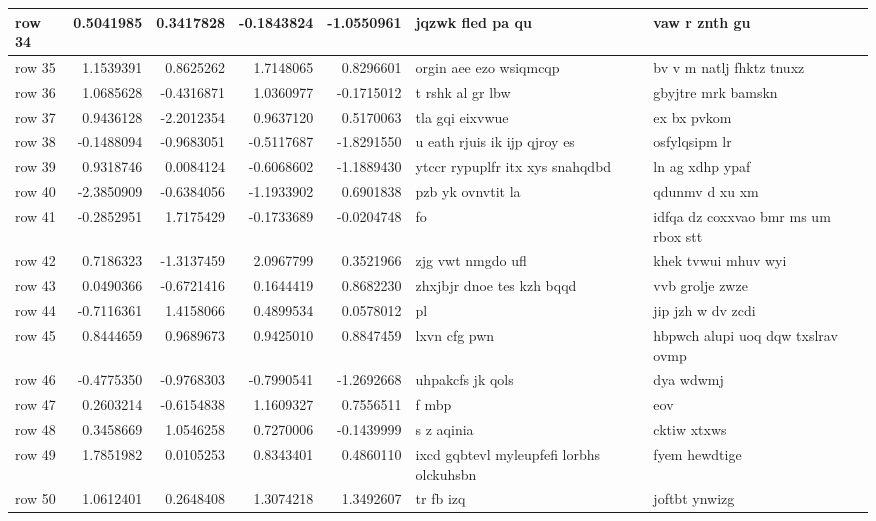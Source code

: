 \documentclass[twoside]{extreport}
\begin{document}
\begin{table}
\begin{tabular}[t]{l|r|r|r|r|l|l}
\hline
row 34 & 0.5041985 & 0.3417828 & -0.1843824 & -1.0550961 & jqzwk fled pa qu & vaw r znth gu\\
\hline
row 35 & 1.1539391 & 0.8625262 & 1.7148065 & 0.8296601 & orgin aee ezo wsiqmcqp & bv v m natlj fhktz tnuxz\\
\hline
row 36 & 1.0685628 & -0.4316871 & 1.0360977 & -0.1715012 & t rshk al gr lbw & gbyjtre mrk bamskn\\
\hline
row 37 & 0.9436128 & -2.2012354 & 0.9637120 & 0.5170063 & tla gqi eixvwue & ex bx pvkom\\
\hline
row 38 & -0.1488094 & -0.9683051 & -0.5117687 & -1.8291550 & u eath rjuis ik ijp qjroy es & osfylqsipm lr\\
\hline
row 39 & 0.9318746 & 0.0084124 & -0.6068602 & -1.1889430 & ytccr rypuplfr itx xys snahqdbd & ln ag xdhp ypaf\\
\hline
row 40 & -2.3850909 & -0.6384056 & -1.1933902 & 0.6901838 & pzb yk ovnvtit la & qdunmv d xu xm\\
\hline
row 41 & -0.2852951 & 1.7175429 & -0.1733689 & -0.0204748 & fo & idfqa dz coxxvao bmr ms um rbox stt\\
\hline
row 42 & 0.7186323 & -1.3137459 & 2.0967799 & 0.3521966 & zjg vwt nmgdo ufl & khek tvwui mhuv wyi\\
\hline
row 43 & 0.0490366 & -0.6721416 & 0.1644419 & 0.8682230 & zhxjbjr dnoe tes kzh bqqd & vvb grolje  zwze\\
\hline
row 44 & -0.7116361 & 1.4158066 & 0.4899534 & 0.0578012 & pl & jip jzh w dv zcdi\\
\hline
row 45 & 0.8444659 & 0.9689673 & 0.9425010 & 0.8847459 & lxvn cfg pwn & hbpwch alupi uoq dqw txslrav ovmp\\
\hline
row 46 & -0.4775350 & -0.9768303 & -0.7990541 & -1.2692668 & uhpakcfs jk qols & dya wdwmj\\
\hline
row 47 & 0.2603214 & -0.6154838 & 1.1609327 & 0.7556511 & f  mbp & eov\\
\hline
row 48 & 0.3458669 & 1.0546258 & 0.7270006 & -0.1439999 & s z aqinia & cktiw xtxws\\
\hline
row 49 & 1.7851982 & 0.0105253 & 0.8343401 & 0.4860110 & ixcd gqbtevl myleupfefi lorbhs olckuhsbn & fyem hewdtige\\
\hline
row 50 & 1.0612401 & 0.2648408 & 1.3074218 & 1.3492607 & tr fb izq & joftbt ynwizg\\
\hline
\end{tabular}
\end{table}
\end{document}
